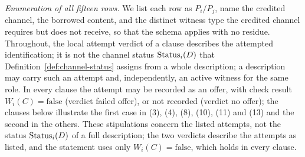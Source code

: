 \emph{Enumeration of all fifteen rows.} We list each row as
\(P_i/P_j\), name the credited channel, the borrowed content, and the
distinct witness type the credited channel requires but does not receive, so
that the schema applies with no residue. Throughout, the local attempt verdict of a clause describes the attempted
identification; it is not the channel status \(\operatorname{Status}_{i}\!\left(D\right)\) that
Definition~\ref{def:channel-status} assigns from a whole description; a
description may carry such an attempt and, independently, an active witness
for the same role. In every clause the attempt may be recorded as an offer, with check result
\(W_i(C)=\mathrm{false}\) (verdict failed offer), or not recorded (verdict no
offer); the clauses below illustrate the first case in (3), (4), (8), (10),
(11) and (13) and the second in the others.
These stipulations concern the listed attempts, not the status
\(\operatorname{Status}_{i}\!\left(D\right)\) of a full description; the two verdicts describe the
attempts as listed, and the statement uses only
\(W_i(C)=\mathrm{false}\), which holds in every clause.
